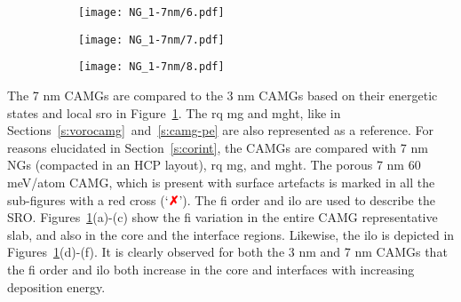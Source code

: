 \begin{figure}[!ht] \centering
	\begin{subfigure}{\textwidth}
		\texttt{[image: NG\_1-7nm/6.pdf]}
	\end{subfigure}%
	\vfill
	\begin{subfigure}{\textwidth}
		\texttt{[image: NG\_1-7nm/7.pdf]}
	\end{subfigure}%
	\vfill
	\begin{subfigure}{\textwidth}
		\texttt{[image: NG\_1-7nm/8.pdf]}
	\end{subfigure}%
	\label{f:7nm-cibdeval}
\end{figure}

The 7 nm CAMGs are compared to the 3 nm CAMGs based on their energetic states and local \gls{sro} in Figure~\ref{f:7nm-cibdeval}. The \gls{rq} \gls{mg} and \gls{mght}, like in Sections~\ref{s:vorocamg}~and~\ref{s:camg-pe} are also represented as a reference. For reasons elucidated in Section~\ref{s:corint}, the CAMGs are compared with 7 nm NGs (compacted in an HCP layout), \gls{rq} \gls{mg}, and \gls{mght}. The porous 7 nm 60 meV/atom CAMG, which is present with surface artefacts is marked in all the sub-figures with a red cross (`\textcolor{red}{\textbf{\faClose}}'). The \gls{fi} order and \gls{ilo} are used to describe the SRO. Figures~\ref{f:7nm-cibdeval}(a)-(c) show the \gls{fi} variation in the entire CAMG representative slab, and also in the core and the interface regions. Likewise, the \gls{ilo} is depicted in Figures~\ref{f:7nm-cibdeval}(d)-(f). It is clearly observed for both the 3 nm and 7 nm CAMGs that the \gls{fi} order and \gls{ilo} both increase in the core and interfaces with increasing deposition energy. \par

